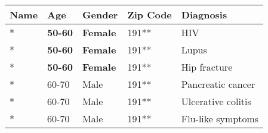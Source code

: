 \begin{tabular}{lllll}
    \toprule
    \textbf{Name} & \textbf{Age} & \textbf{Gender} & \textbf{Zip Code} & \textbf{Diagnosis} \\\midrule
    * & \textbf{50-60} & \textbf{Female} & 191** & HIV \\ 
    * & \textbf{50-60} & \textbf{Female} & 191** & Lupus \\ 
    * & \textbf{50-60} & \textbf{Female} & 191** & Hip fracture \\ 
    * & 60-70 & Male & 191** & Pancreatic cancer \\ 
    * & 60-70 & Male & 191** & Ulcerative colitis \\ 
    * & 60-70 & Male & 191** & Flu-like symptoms \\ \bottomrule
\end{tabular}

